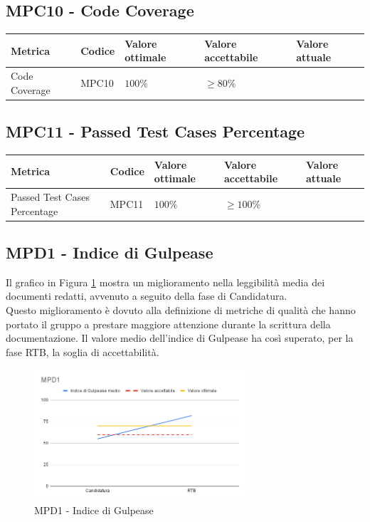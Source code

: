 \subsection{MPC10 - Code Coverage}
\label{s:mpc10}
\begin{table}[H]
    \centering
    \begin{tabularx}{\textwidth}{p{5.5cm}|X|l|l|l}
        \hline
		\textbf{Metrica} & \textbf{Codice} & \textbf{Valore ottimale} & \textbf{Valore accettabile}  & \textbf{Valore attuale} \\
        \hline
        Code Coverage   & MPC10 & $100\%$   & $\ge 80\%$  & \\
    \end{tabularx}
\end{table}


\subsection{MPC11 - Passed Test Cases Percentage}
\label{s:mpc11}
\begin{table}[H]
    \centering
    \begin{tabularx}{\textwidth}{p{5.5cm}|X|l|l|l}
        \hline
		\textbf{Metrica} & \textbf{Codice} & \textbf{Valore ottimale} & \textbf{Valore accettabile}  & \textbf{Valore attuale} \\
        \hline
        Passed Test Cases Percentage    & MPC11 & $100\%$   & $\ge 100\%$ &  \\
    \end{tabularx}
\end{table}




\subsection{MPD1 - Indice di Gulpease}
\label{s:mpd1}
Il grafico in Figura \ref{fig:mpd1} mostra un miglioramento nella leggibilità media dei documenti redatti, avvenuto a seguito della fase di Candidatura.\\
Questo miglioramento è dovuto alla definizione di metriche di qualità che hanno portato il gruppo a prestare maggiore attenzione durante la scrittura della documentazione.
Il valore medio dell'indice di Gulpease ha così superato, per la fase RTB, la soglia di accettabilità.

\begin{figure}[htbp]
    \centering
    \includegraphics[width=0.7\textwidth]{img/MPD1.png}
    \caption{MPD1 - Indice di Gulpease}
    \label{fig:mpd1}
\end{figure}



